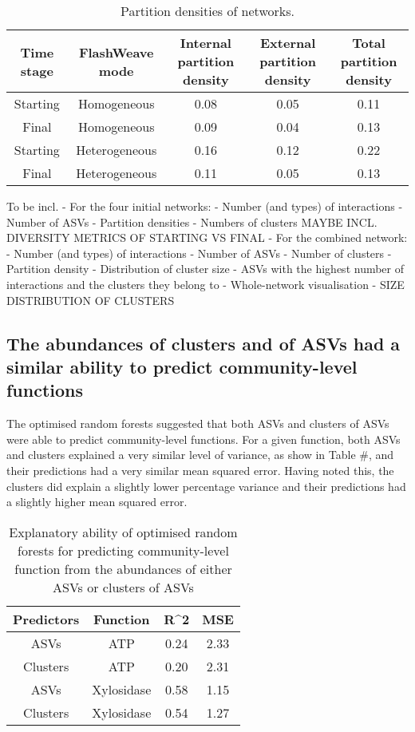 \documentclass[11pt]{article}
\begin{document}
\begin{table}[h]
\centering
\caption{Partition densities of networks.}
\label{tab:sample}
\begin{tabular}{|c|c|c|c|c|}
\hline
Time stage & FlashWeave mode & Internal partition density & External partition density & Total partition density \\
\hline
Starting & Homogeneous & 0.08 & 0.05 & 0.11 \\
Final & Homogeneous & 0.09 & 0.04 & 0.13 \\
Starting & Heterogeneous & 0.16 & 0.12 & 0.22 \\
Final & Heterogeneous & 0.11 & 0.05 & 0.13 \\
\hline
\end{tabular}
\end{table}


To be incl.
- For the four initial networks:
    - Number (and types) of interactions
    - Number of ASVs
    - Partition densities
    - Numbers of clusters
    MAYBE INCL. DIVERSITY METRICS OF STARTING VS FINAL
- For the combined network:
    - Number (and types) of interactions
    - Number of ASVs
    - Number of clusters
    - Partition density
    - Distribution of cluster size
    - ASVs with the highest number of interactions and the clusters they belong to
    - Whole-network visualisation
    - SIZE DISTRIBUTION OF CLUSTERS


    
\subsection{The abundances of clusters and of ASVs had a similar ability to predict community-level functions}
The optimised random forests suggested that both ASVs and clusters of ASVs were able to predict community-level functions. For a given function, both ASVs and clusters explained a very similar level of variance, as show in Table #, and their predictions had a very similar mean squared error. Having noted this, the clusters did explain a slightly lower percentage variance and their predictions had a slightly higher mean squared error.

\begin{table}[h]
\centering
\caption{Explanatory ability of optimised random forests for predicting community-level function from the abundances of either ASVs or clusters of ASVs}
\label{tab:sample}
\begin{tabular}{|c|c|c|c|}
\hline
Predictors & Function & R^2 & MSE \\
\hline
ASVs & ATP & 0.24 & 2.33 \\
Clusters & ATP & 0.20 & 2.31 \\
ASVs & Xylosidase & 0.58 & 1.15 \\
Clusters & Xylosidase & 0.54 & 1.27 \\
\hline
\end{tabular}
\end{table}
\end{document}

